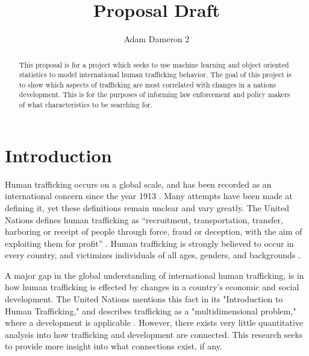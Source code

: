 \documentclass{article} %
\title{Proposal Draft}
\author{
Adam Dameron 2
}
\begin{document}
\maketitle

\begin{abstract}
This proposal is for a project which seeks to use machine learning and object oriented statistics to model international human trafficking behavior. The goal of this project is to show which aspects of trafficking are most correlated with changes in a nations development. This is for the purposes of informing law enforcement and policy makers of what characteristics to be searching for.
\end{abstract}

\section{Introduction}
	Human trafficking occurs on a global scale, and has been recorded as an international concern since the year 1913 \parencite{Aromaa2007}. Many attempts have been made at defining it, yet these definitions remain unclear and vary greatly. The United Nations defines human trafficking as “recruitment, transportation, transfer, harboring or receipt of people through force, fraud or deception, with the aim of exploiting them for profit” \parencite{Raymond2002}. Human trafficking is strongly believed to occur in every country, and victimizes individuals of all ages, genders, and backgrounds \parencite{JacK2012}.\medskip
	
	A major gap in the global understanding of international human trafficking, is in how human trafficking is effected by changes in a country's economic and social development. The United Nations mentions this fact in its "Introduction to Human Trafficking," and describes trafficking as a "multidimensional problem," where a development is applicable \parencite{kangaspunta_2008}. However, there exists very little quantitative analysis into how trafficking and development are connected. This research seeks to provide more insight into what connections exist, if any.
	
	
\end{document}
